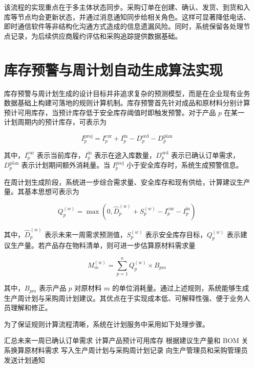 该流程的实现重点在于多主体状态同步。采购订单在创建、确认、发货、到货和入库等节点均会更新状态，并通过消息通知同步给相关角色。这样可显著降低电话、即时通信软件等非结构化沟通方式造成的信息遗漏风险。同时，系统保留各处理节点记录，为后续供应商履约评估和采购追踪提供数据基础。

\section{库存预警与周计划自动生成算法实现}

库存预警与周计划生成的设计目标并非追求复杂的预测模型，而是在企业现有业务数据基础上构建可落地的规则计算机制。库存预警首先针对成品和原材料分别计算预计可用库存，当预计库存低于安全库存阈值时即触发预警。对于产品 $p$ 在某一计划周期内的预计库存，可表示为

\begin{equation}
I_{p}^{\mathrm{proj}} = I_{p}^{\mathrm{cur}} + I_{p}^{\mathrm{in}} - D_{p}^{\mathrm{ord}} - D_{p}^{\mathrm{plan}}
\end{equation}

其中，$I_{p}^{\mathrm{cur}}$ 表示当前库存，$I_{p}^{\mathrm{in}}$ 表示在途入库数量，$D_{p}^{\mathrm{ord}}$ 表示已确认订单需求，$D_{p}^{\mathrm{plan}}$ 表示计划期间额外消耗量。当 $I_{p}^{\mathrm{proj}}$ 小于安全库存时，系统生成预警信息。

在周计划生成阶段，系统进一步综合需求量、安全库存和现有供给，计算建议生产量。其基本思想可表示为

\begin{equation}
Q_{p}^{(w)} = \max \left(0, \hat{D}_{p}^{(w)} + S_{p}^{(w)} - I_{p}^{\mathrm{cur}} - I_{p}^{\mathrm{in}} \right)
\end{equation}

其中，$\hat{D}_{p}^{(w)}$ 表示未来一周需求预测值，$S_{p}^{(w)}$ 表示安全库存目标，$Q_{p}^{(w)}$ 表示建议生产量。若产品存在物料清单，则可进一步估算原材料需求量

\begin{equation}
M_{m}^{(w)} = \sum_{p=1}^{n} Q_{p}^{(w)} \times B_{pm}
\end{equation}

其中，$B_{pm}$ 表示产品 $p$ 对原材料 $m$ 的单位消耗量。通过上述规则，系统能够生成生产周计划与采购周计划建议。其优点在于实现成本低、可解释性强、便于业务人员理解和修正。

为了保证规则计算流程清晰，系统在计划服务中采用如下处理步骤。

\begin{algorithm}[H]
    汇总未来一周已确认订单需求\;
    计算产品预计可用库存\;
    根据建议生产量和 BOM 关系换算原材料需求\;
    写入生产周计划与采购周计划记录\;
    向生产管理员和采购管理员发送计划通知\;
    \caption{周计划自动生成流程}
\end{algorithm}

